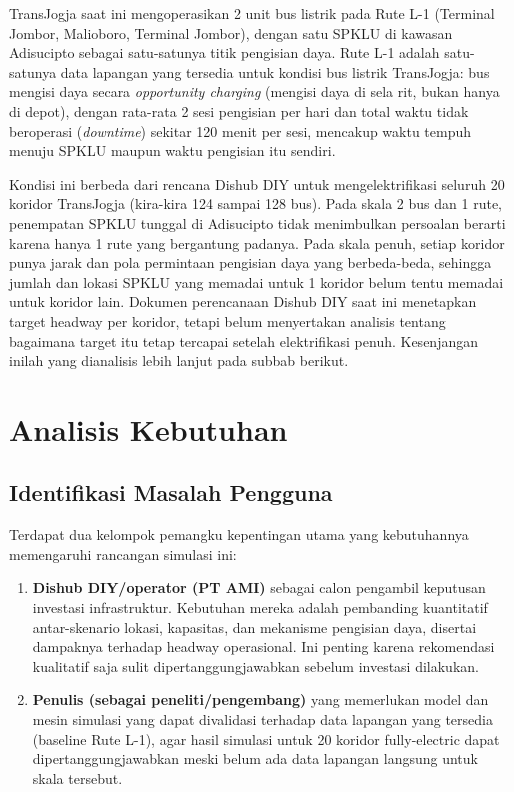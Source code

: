 TransJogja saat ini mengoperasikan 2 unit bus listrik pada Rute L-1
(Terminal Jombor, Malioboro, Terminal Jombor), dengan satu SPKLU di kawasan
Adisucipto sebagai satu-satunya titik pengisian daya. Rute L-1 adalah
satu-satunya data lapangan yang tersedia untuk kondisi bus listrik
TransJogja: bus mengisi daya secara \textit{opportunity charging} (mengisi
daya di sela rit, bukan hanya di depot), dengan rata-rata 2 sesi pengisian
per hari dan total waktu tidak beroperasi (\textit{downtime}) sekitar 120
menit per sesi, mencakup waktu tempuh menuju SPKLU maupun waktu pengisian
itu sendiri.

Kondisi ini berbeda dari rencana Dishub DIY untuk mengelektrifikasi seluruh
20 koridor TransJogja (kira-kira 124 sampai 128 bus). Pada skala 2 bus dan
1 rute, penempatan SPKLU tunggal di Adisucipto tidak menimbulkan persoalan
berarti karena hanya 1 rute yang bergantung padanya. Pada skala penuh,
setiap koridor punya jarak dan pola permintaan pengisian daya yang
berbeda-beda, sehingga jumlah dan lokasi SPKLU yang memadai untuk 1 koridor
belum tentu memadai untuk koridor lain. Dokumen perencanaan Dishub DIY saat
ini menetapkan target headway per koridor, tetapi belum menyertakan analisis
tentang bagaimana target itu tetap tercapai setelah elektrifikasi penuh.
Kesenjangan inilah yang dianalisis lebih lanjut pada subbab berikut.

\section{Analisis Kebutuhan}

\subsection{Identifikasi Masalah Pengguna}

Terdapat dua kelompok pemangku kepentingan utama yang kebutuhannya
memengaruhi rancangan simulasi ini:
\begin{enumerate}
	\item \textbf{Dishub DIY/operator (PT AMI)} sebagai calon pengambil
	keputusan investasi infrastruktur. Kebutuhan mereka adalah pembanding
	kuantitatif antar-skenario lokasi, kapasitas, dan mekanisme pengisian
	daya, disertai dampaknya terhadap headway operasional. Ini penting karena
	rekomendasi kualitatif saja sulit dipertanggungjawabkan sebelum investasi
	dilakukan.
	\item \textbf{Penulis (sebagai peneliti/pengembang)} yang memerlukan model
	dan mesin simulasi yang dapat divalidasi terhadap data lapangan yang
	tersedia (baseline Rute L-1), agar hasil simulasi untuk 20 koridor
	fully-electric dapat dipertanggungjawabkan meski belum ada data lapangan
	langsung untuk skala tersebut.
\end{enumerate}

